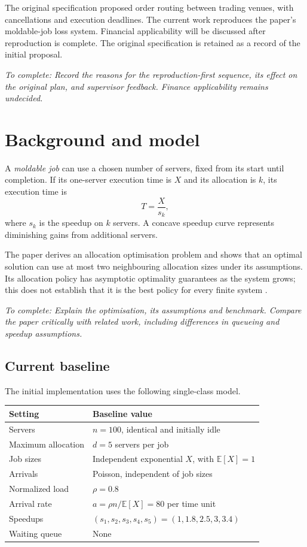 \documentclass[11pt,a4paper,oneside]{article}
\newcommand{\draftnote}[1]{\par\textit{To complete: #1}\par}
\begin{document}
The original specification proposed order routing between trading venues, with
cancellations and execution deadlines. The current work reproduces the paper's
moldable-job loss system. Financial applicability will be discussed after
reproduction is complete.
The original specification is retained as a record of the initial proposal.

\draftnote{Record the reasons for the reproduction-first sequence, its effect on
the original plan, and supervisor feedback. Finance applicability remains undecided.}

\section{Background and model}

A \emph{moldable job} can use a chosen number of servers, fixed from its start
until completion. If its one-server execution time is $X$ and its allocation is
$k$, its execution time is
\begin{equation}
  T = \frac{X}{s_k},
\end{equation}
where $s_k$ is the speedup on $k$ servers. A concave speedup curve represents
diminishing gains from additional servers.

The paper derives an allocation optimisation problem and shows that an optimal
solution can use at most two neighbouring allocation sizes under its assumptions.
Its allocation policy has asymptotic optimality guarantees as the system grows;
this does not establish that it is the best policy for every finite system
\cite{mukhopadhyay2026}.

\draftnote{Explain the optimisation, its assumptions and benchmark. Compare the
paper critically with related work, including differences in queueing and speedup
assumptions.}

\subsection{Current baseline}

The initial implementation uses the following single-class model.

\begin{center}
\begin{tabularx}{\linewidth}{@{}lX@{}}
\toprule
Setting & Baseline value \\
\midrule
Servers & $n=100$, identical and initially idle \\
Maximum allocation & $d=5$ servers per job \\
Job sizes & Independent exponential $X$, with $\mathbb{E}[X]=1$ \\
Arrivals & Poisson, independent of job sizes \\
Normalized load & $\rho=0.8$ \\
Arrival rate & $a=\rho n/\mathbb{E}[X]=80$ per time unit \\
Speedups & $(s_1,s_2,s_3,s_4,s_5)=(1,1.8,2.5,3,3.4)$ \\
Waiting queue & None \\
\bottomrule
\end{tabularx}
\end{center}
\end{document}
